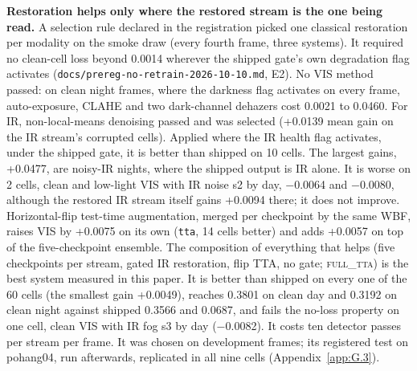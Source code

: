 \documentclass[journal,onecolumn]{IEEEtran}
\begin{document}
\textbf{Restoration helps only where the restored stream is the one being read.} A selection rule declared in the registration picked one classical restoration per modality on the smoke draw (every fourth frame, three systems). It required no clean-cell loss beyond 0.0014 wherever the shipped gate's own degradation flag activates (\texttt{docs/\allowbreak{}prereg-\allowbreak{}no-\allowbreak{}retrain-\allowbreak{}2026-\allowbreak{}10-\allowbreak{}10.md}, E2). No VIS method passed: on clean night frames, where the darkness flag activates on every frame, auto-exposure, CLAHE and two dark-channel dehazers cost 0.0021 to 0.0460. For IR, non-local-means denoising passed and was selected (+0.0139 mean gain on the IR stream's corrupted cells). Applied where the IR health flag activates, under the shipped gate, it is better than shipped on 10 cells. The largest gains, +0.0477, are noisy-IR nights, where the shipped output is IR alone. It is worse on 2 cells, clean and low-light VIS with IR noise s2 by day, $-$0.0064 and $-$0.0080, although the restored IR stream itself gains +0.0094 there; it does not improve. Horizontal-flip test-time augmentation, merged per checkpoint by the same WBF, raises VIS by +0.0075 on its own (\texttt{tta}, 14 cells better) and adds +0.0057 on top of the five-checkpoint ensemble. The composition of everything that helps (five checkpoints per stream, gated IR restoration, flip TTA, no gate; \textsc{full\_tta}) is the best system measured in this paper. It is better than shipped on every one of the 60 cells (the smallest gain +0.0049), reaches 0.3801 on clean day and 0.3192 on clean night against shipped 0.3566 and 0.0687, and fails the no-loss property on one cell, clean VIS with IR fog s3 by day ($-$0.0082). It costs ten detector passes per stream per frame. It was chosen on development frames; its registered test on pohang04, run afterwards, replicated in all nine cells (Appendix~\ref{app:G.3}).
\end{document}
